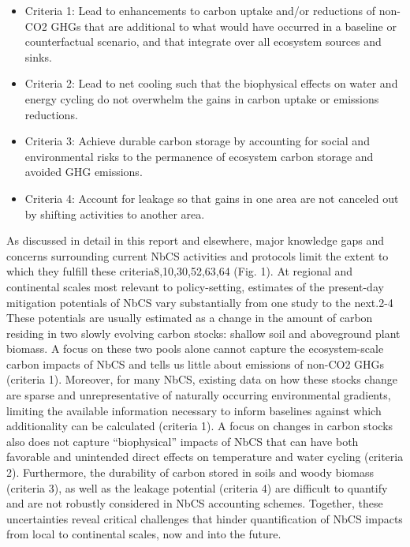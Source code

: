 \documentclass[
  letterpaper,
  DIV=11,
  numbers=noendperiod]{scrreprt}
\providecommand{\tightlist}{%
  \setlength{\itemsep}{0pt}\setlength{\parskip}{0pt}}\usepackage{longtable,booktabs,array}
\begin{document}
\begin{itemize}
\tightlist
\item
  Criteria 1: Lead to enhancements to carbon uptake and/or reductions of
  non-CO2 GHGs that are additional to what would have occurred in a
  baseline or counterfactual scenario, and that integrate over all
  ecosystem sources and sinks.
\item
  Criteria 2: Lead to net cooling such that the biophysical effects on
  water and energy cycling do not overwhelm the gains in carbon uptake
  or emissions reductions.
\item
  Criteria 3: Achieve durable carbon storage by accounting for social
  and environmental risks to the permanence of ecosystem carbon storage
  and avoided GHG emissions.
\item
  Criteria 4: Account for leakage so that gains in one area are not
  canceled out by shifting activities to another area.
\end{itemize}

As discussed in detail in this report and elsewhere, major knowledge
gaps and concerns surrounding current NbCS activities and protocols
limit the extent to which they fulfill these criteria8,10,30,52,63,64
(Fig. 1). At regional and continental scales most relevant to
policy-setting, estimates of the present-day mitigation potentials of
NbCS vary substantially from one study to the next.2-4 These potentials
are usually estimated as a change in the amount of carbon residing in
two slowly evolving carbon stocks: shallow soil and aboveground plant
biomass. A focus on these two pools alone cannot capture the
ecosystem-scale carbon impacts of NbCS and tells us little about
emissions of non-CO2 GHGs (criteria 1). Moreover, for many NbCS,
existing data on how these stocks change are sparse and unrepresentative
of naturally occurring environmental gradients, limiting the available
information necessary to inform baselines against which additionality
can be calculated (criteria 1). A focus on changes in carbon stocks also
does not capture ``biophysical'' impacts of NbCS that can have both
favorable and unintended direct effects on temperature and water cycling
(criteria 2). Furthermore, the durability of carbon stored in soils and
woody biomass (criteria 3), as well as the leakage potential (criteria
4) are difficult to quantify and are not robustly considered in NbCS
accounting schemes. Together, these uncertainties reveal critical
challenges that hinder quantification of NbCS impacts from local to
continental scales, now and into the future.
\end{document}
